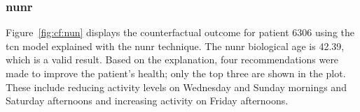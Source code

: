 \subsubsection{\gls{nunr}}
Figure~\ref{fig:cf:nun} displays the counterfactual outcome for patient $6306$ using the \gls{tcn} model explained with the \gls{nunr} technique.
The \gls{nunr} biological age is 42.39, which is a valid result. Based on the explanation, four recommendations were made to improve the patient's health; only the top three are shown in the plot. These include reducing activity levels on Wednesday and Sunday mornings and Saturday afternoons and increasing activity on Friday afternoons.

